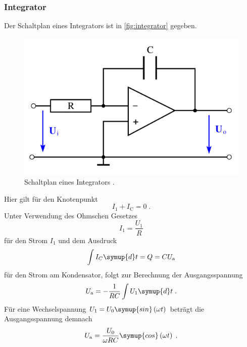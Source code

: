 \subsubsection{Integrator}
Der Schaltplan eines Integrators ist in \autoref{fig:integrator} gegeben.
\begin{figure}
    \centering
    \includegraphics[width = .5\textwidth]{"content/pics/integrator.png"}
    \caption{Schaltplan eines Integrators \cite{v51}.}
    \label{fig:integrator}
\end{figure}
Hier gilt für den Knotenpunkt 
\begin{equation*}
    I_1 + I_\text{C} = 0\;.
\end{equation*}
Unter Verwendung des Ohmschen Gesetzes
\begin{equation*}
    I_1 = \frac{U_1}{R}
\end{equation*}
für den Strom $I_1$ und dem Ausdruck
\begin{equation*}
    \int I_C \symup{d}t = Q = CU_\text{a}
\end{equation*}
für den Strom am Kondensator, folgt zur Berechnung der Ausgangsspannung
\begin{equation}
    U_\text{a} = -\frac{1}{RC} \int U_1 \symup{d}t \;.
    \label{eq:integrator1}
\end{equation}
Für eine Wechselspannung $U_1 = U_0 \symup{sin}\left(\omega t\right)$ beträgt die Ausgangsspannung demnach
\begin{equation}
    U_\text{a} = \frac{U_0}{\omega RC} \symup{cos}\left(\omega t\right) \;.
    \label{eq:integrator2}
\end{equation}


